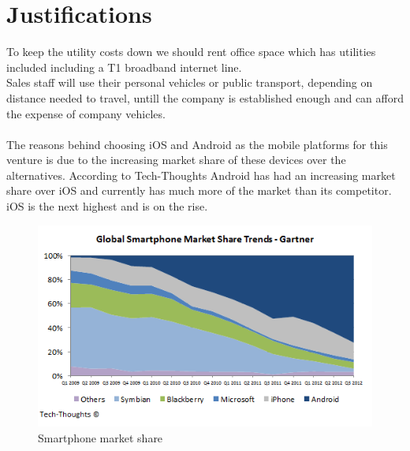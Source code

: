 \documentclass{article}
\begin{document}
\section{Justifications}
To keep the utility costs down we should rent office space which has utilities included including a T1 broadband internet line.
\\Sales staff will use their personal vehicles or public transport, depending on distance needed to travel, untill the company is established enough and can afford the expense of company vehicles.
\\\\The reasons behind choosing iOS and Android as the mobile platforms for this venture is due to the increasing market share of these devices over the alternatives.  According to Tech-Thoughts \cite{tech} Android has had an increasing market share over iOS and currently has much more of the market than its competitor.  iOS is the next highest and is on the rise.
\begin{figure}[h]
\centering
        \includegraphics{market_share.png}
        \caption{Smartphone market share}
        \label{Smartphone market share}
\end{figure}
\end{document}
